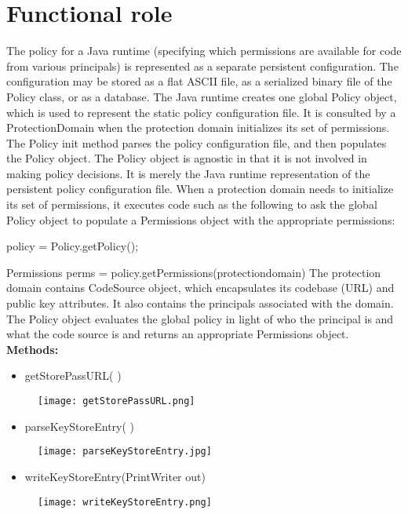 \documentclass[12pt, oneside]{book}   	%
\begin{document}
\chapter{Functional role}
The policy for a Java runtime (specifying which permissions are available for code from various principals) is represented as a separate persistent configuration. The configuration may be stored as a flat ASCII file, as a serialized binary file of the Policy class, or as a database.
\newline
The Java runtime creates one global Policy object, which is used to represent the static policy configuration file. It is consulted by a ProtectionDomain when the protection domain initializes its set of permissions.
\newline
The Policy init method parses the policy configuration file, and then populates the Policy object. The Policy object is agnostic in that it is not involved in making policy decisions. It is merely the Java runtime representation of the persistent policy configuration file.
\newline
When a protection domain needs to initialize its set of permissions, it executes code such as the following to ask the global Policy object to populate a Permissions object with the appropriate permissions:
\newline

  \thinspace policy = Policy.getPolicy();
 \newline
 
  \thinspace Permissions perms = policy.getPermissions(protectiondomain)
 \newline
 \newline
The protection domain contains CodeSource object, which encapsulates its codebase (URL) and public key attributes. It also contains the principals associated with the domain. The Policy object evaluates the global policy in light of who the principal is and what the code source is and returns an appropriate Permissions object.
\clearpage
\textbf{\Large{Methods:}}
\begin{itemize}
\item getStorePassURL( )
\end{itemize}
\begin{figure}[h]
\center \texttt{[image: getStorePassURL.png]}
\end{figure}
\clearpage
\begin{itemize}
\item parseKeyStoreEntry( )
\end{itemize}
\begin{figure}[h]
\center \texttt{[image: parseKeyStoreEntry.jpg]}
\end{figure}
\clearpage
\begin{itemize}
\item writeKeyStoreEntry(PrintWriter out)
\end{itemize}
\begin{figure}[h]
\center \texttt{[image: writeKeyStoreEntry.png]}
\end{figure}
\end{document}
